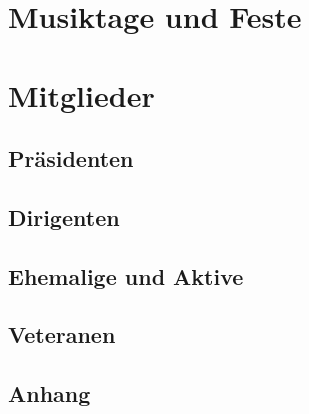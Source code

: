 \documentclass[]{book}
\begin{document}




\part{Musiktage und Feste}




\part{Mitglieder}

\chapter{Präsidenten}


\chapter{Dirigenten}


\chapter{Ehemalige und Aktive}


\chapter{Veteranen}



\backmatter

\chapter{Anhang}
\end{document}
